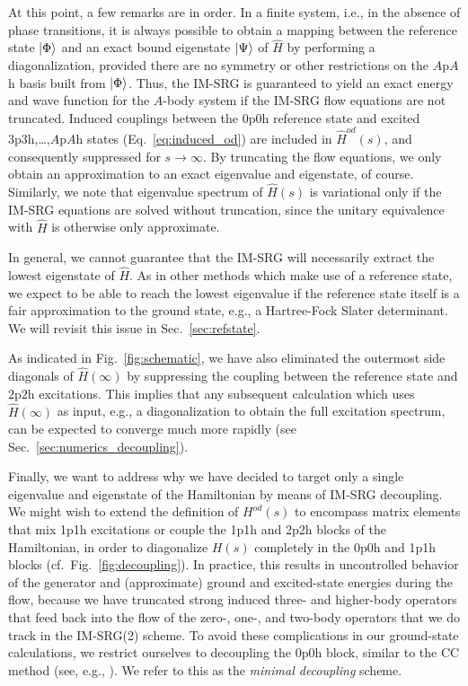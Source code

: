 At this point, a few remarks are in order. In a finite system, i.e., in the absence of phase transitions, 
it is always possible to obtain a mapping between the reference state $\ket{\Phi}$ and an exact bound 
eigenstate $\ket{\Psi}$ of $\hat{H}$ by performing a diagonalization, provided there are no symmetry or other 
restrictions on the $A$p$A$h basis built from $\ket{\Phi}$. Thus, the IM-SRG is guaranteed to yield an 
exact energy and wave function for the $A$-body system if the IM-SRG flow equations are not truncated. 
Induced couplings between the 0p0h reference state and excited 3p3h,\ldots,$A$p$A$h states 
(Eq.~\eqref{eq:induced_od}) are included in $\hat{H}^{od}(s)$, and consequently suppressed for $s\to\infty$. 
By truncating the flow equations, we only obtain an approximation to an exact eigenvalue and eigenstate, 
of course. Similarly, we note that eigenvalue spectrum of $\hat{H}(s)$ is variational only if the IM-SRG equations are solved without truncation, since the unitary equivalence with $\hat{H}$ is otherwise only approximate. 

In general, we cannot guarantee that the IM-SRG will necessarily extract the lowest eigenstate 
of $\hat{H}$. As in other methods which make use of a reference state, we expect to be able to reach 
the lowest eigenvalue if the reference state itself is a fair approximation to the ground state, e.g., 
a Hartree-Fock Slater determinant. We will revisit this issue in Sec.~\ref{sec:refstate}.

As indicated in Fig.~\ref{fig:schematic}, we have also eliminated the outermost side diagonals of 
$\hat{H}(\infty)$ by suppressing the coupling between the reference state and $2$p$2$h excitations. This 
implies that any subsequent calculation which uses $\hat{H}(\infty)$ as input, e.g., a diagonalization to 
obtain the full excitation spectrum, can be expected to converge much more rapidly (see 
Sec.~\ref{sec:numerics_decoupling}). 

Finally, we want to address why we have decided to target only a single eigenvalue and eigenstate
of the Hamiltonian by means of IM-SRG decoupling. We might wish to extend the definition 
of $H^{od}(s)$ to encompass matrix elements that mix 1p1h excitations or couple the 1p1h and 2p2h 
blocks of the Hamiltonian, in order to diagonalize $H(s)$ completely in the 0p0h and 1p1h blocks 
(cf.~Fig.~\ref{fig:decoupling}). In practice, this results in uncontrolled behavior of the generator 
and (approximate) ground and excited-state energies during the flow, because we have truncated strong induced 
three- and higher-body operators that feed back into the flow of the zero-, one-, and two-body operators that
we do track in the IM-SRG(2) scheme. To avoid these complications in our ground-state calculations, we 
restrict ourselves to decoupling the 0p0h block, similar to the CC method (see, e.g., 
\cite{Shavitt:2009}). We refer to this as the \emph{minimal decoupling} scheme. 


